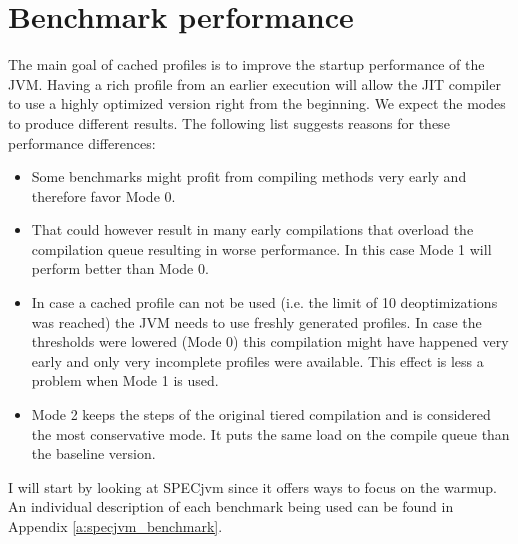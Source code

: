 \section{Benchmark performance}
\label{s:perf_benchmark}
The main goal of cached profiles is to improve the startup performance of the JVM. Having a rich profile from an earlier execution will allow the JIT compiler to use a highly optimized version right from the beginning.
We expect the modes to produce different results. The following list suggests reasons for these performance differences:
\begin{itemize}
  \item Some benchmarks might profit from compiling methods very early and therefore favor Mode 0.
  \item That could however result in many early compilations that overload the compilation queue resulting in worse performance. In this case Mode 1 will perform better than Mode 0.
  \item In case a cached profile can not be used (i.e. the limit of 10 deoptimizations was reached) the JVM needs to use freshly generated profiles. In case the thresholds were lowered (Mode 0) this compilation might have happened very early and only very incomplete profiles were available. This effect is less a problem when Mode 1 is used.
  \item Mode 2 keeps the steps of the original tiered compilation and is considered the most conservative mode. It puts the same load on the compile queue than the baseline version.
\end{itemize}
I will start by looking at SPECjvm since it offers ways to focus on the warmup. An individual description of each benchmark being used can be found in Appendix \ref{a:specjvm_benchmark}.
